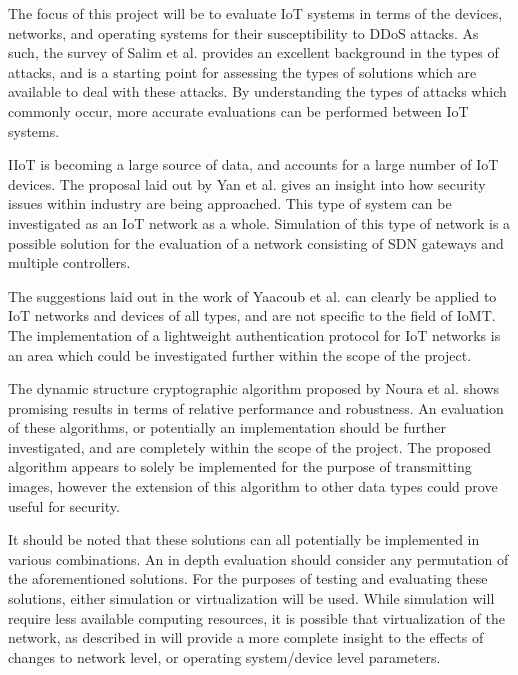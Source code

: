 The focus of this project will be to evaluate IoT systems in terms of the
devices, networks, and operating systems for their susceptibility to DDoS
attacks. As such, the survey of Salim et al.\cite{Salim2019} provides an
excellent background in the types of attacks, and is a starting point for
assessing the types of solutions which are available to deal with these attacks.
By understanding the types of attacks which commonly occur, more accurate
evaluations can be performed between IoT systems.

IIoT is becoming a large source of data, and accounts for a large number of IoT
devices. The proposal laid out by Yan et al.\cite{iiot_2019} gives an insight
into how security issues within industry are being approached. This type of
system can be investigated as an IoT network as a whole. Simulation of this type
of network is a possible solution for the evaluation of a network consisting of
SDN gateways and multiple controllers.

The suggestions laid out in the work of Yaacoub et al.\cite{iomt_2019} can
clearly be applied to IoT networks and devices of all types, and are not
specific to the field of IoMT. The implementation of a lightweight
authentication protocol for IoT networks is an area which could be investigated
further within the scope of the project.

The dynamic structure cryptographic algorithm proposed by Noura et
al.\cite{iotalgorithm} shows promising results in terms of relative performance
and robustness. An evaluation of these algorithms, or potentially an
implementation should be further investigated, and are completely within the
scope of the project. The proposed algorithm appears to solely be implemented
for the purpose of transmitting images, however the extension of this algorithm
to other data types could prove useful for security.

It should be noted that these solutions can all potentially be implemented in
various combinations. An in depth evaluation should consider any permutation of
the aforementioned solutions. For the purposes of testing and evaluating these
solutions, either simulation or virtualization will be used. While simulation
will require less available computing resources, it is possible that
virtualization of the network, as described in \cite{iiot_2019} will provide a
more complete insight to the effects of changes to network level, or operating
system/device level parameters.
